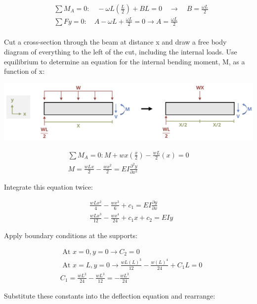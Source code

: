 \documentclass[
  letterpaper,
  DIV=11,
  numbers=noendperiod]{scrreprt}
\begin{document}
\begin{tcolorbox}
\begin{tcolorbox}
\[
\begin{aligned} & \sum M_A=0: \quad-\omega L\left(\frac{L}{2}\right)+B L=0 \quad \rightarrow \quad B=\frac{\omega L}{2} \\ & \sum F y=0: \quad A-\omega L+\frac{\omega L}{2}=0 \rightarrow A=\frac{\omega L}{2} \\ & \end{aligned}
\]

Cut a cross-section through the beam at distance x and draw a free body
diagram of everything to the left of the cut, including the internal
loads. Use equilibrium to determine an equation for the internal bending
moment, M, as a function of x:

\begin{center}
\includegraphics{images/CH11 PNGs/example11.1-3.png}
\end{center}

\[
\begin{gathered} \sum M_A=0: M+w x\left(\frac{x}{2}\right)-\frac{w L}{2}(x)=0 \\ M =\frac{w L x}{2}-\frac{w x^2}{2}=E I \frac{\partial^2 y}{\partial x^2}\end{gathered}
\]

Integrate this equation twice:

\[
\begin{aligned} & \frac{w L x^2}{4}-\frac{w x^3}{6}+c_1=E I \frac{\partial y}{\partial x} \\ & \frac{w L x^3}{12}-\frac{w x^4}{24}+c_1 x+c_2=E I y\end{aligned}
\]

Apply boundary conditions at the supports:

\[
\begin{aligned} & \text { At } x=0, y=0 \rightarrow C_2=0 \\ & \text { At } x=L, y=0 \rightarrow \frac{w L(L)^3}{12}-\frac{w(L)^4}{24}+C_1 L=0 \\ & C_1=\frac{w L^3}{24}-\frac{wL^3}{12}=-\frac{w L^3}{24}\end{aligned}
\]

Substitute these constants into the deflection equation and rearrange:


\end{tcolorbox}
\end{tcolorbox}
\end{document}
